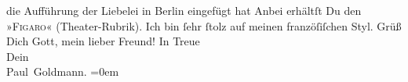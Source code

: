\begin{ledgroupsized}[t]{13cm}
{{{                     die Aufführung der Liebelei in Berlin eingefügt hat}}}\label{K_L02767-4h} Anbei erhältſt Du den »\textsc{Figaro}« (Theater-Rubrik). Ich bin ſehr {\pb}ſtolz auf
               meinen franzöſiſchen Styl.\pend
           \pstart
           Grüß Dich Gott, mein lieber Freund!\pend
           \pstart
           In Treue {\\[\baselineskip]}Dein {\\[\baselineskip]}\spacefill\mbox{Paul Goldmann.}\pend
           \leftskip=0em{}
         
         \endnumbering{}\end{ledgroupsized}  \newcommand{\dateiname}{L02767}\newcommand{\titel}{Paul Goldmann an Arthur Schnitzler, 6. 2. [1896]}\newcommand{\editorInnen}{Martin Anton Müller und Laura Untner}
      